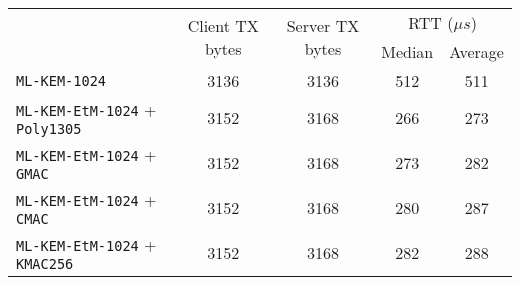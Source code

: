 \documentclass[runningheads]{llncs}
\newcommand{\us}{\mu s}
\begin{document}
\begin{table}[h]
\begin{tabular}{|p{14em}|c|c|c|c|}
        & \multirow{2}{*}{Client TX bytes}
        & \multirow{2}{*}{Server TX bytes}
        & \multicolumn{2}{|c|}{RTT ($\us$)} \\
        \cline{4-5}
        & & & Median & Average \\
        \hline
        \texttt{ML-KEM-1024} & 3136 & 3136 & 512 & 511 \\
        \hline
        \texttt{ML-KEM-EtM-1024} + \texttt{Poly1305} & 3152 & 3168 & 266 & 273 \\
        \hline
        \texttt{ML-KEM-EtM-1024} + \texttt{GMAC} & 3152 & 3168 & 273 & 282 \\
        \hline
        \texttt{ML-KEM-EtM-1024} + \texttt{CMAC} & 3152 & 3168 & 280 & 287 \\
        \hline
        \texttt{ML-KEM-EtM-1024} + \texttt{KMAC256} & 3152 & 3168 & 282 & 288 \\
        \hline
    \end{tabular}
\end{table}
\end{document}
